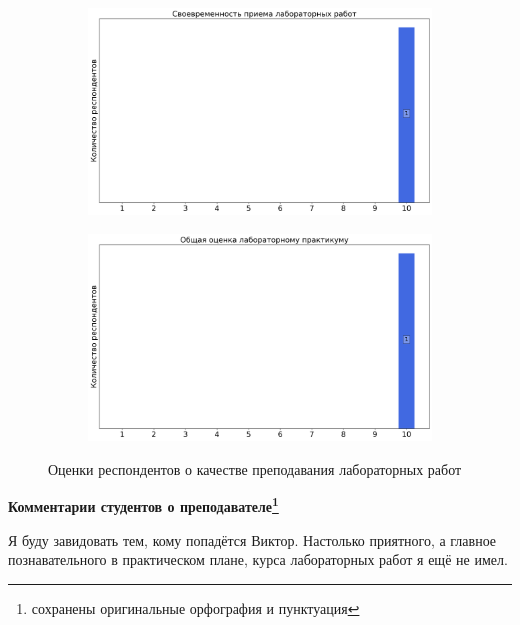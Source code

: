 \begin{figure}[H]
\begin{subfigure}[b]{0.45\textwidth}
				\includegraphics[width=\textwidth]{images/2 course/Общая физика - электричество и магнетизм/labniks-marks-Цеваков В.А.-2.png}
			\end{subfigure}
			\begin{subfigure}[b]{0.45\textwidth}
				\centering
				\includegraphics[width=\textwidth]{images/2 course/Общая физика - электричество и магнетизм/labniks-marks-Цеваков В.А.-3.png}
			\end{subfigure}	
			\caption{Оценки респондентов о качестве преподавания лабораторных работ}
		\end{figure}

		\textbf{Комментарии студентов о преподавателе\protect\footnote{сохранены оригинальные орфография и пунктуация}}
			\begin{commentbox} 
				Я буду завидовать тем, кому попадётся Виктор. Настолько приятного, а главное познавательного в практическом плане, курса лабораторных работ я ещё не имел. 
			\end{commentbox} 

